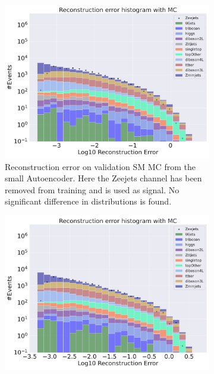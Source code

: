 \begin{figure}[H]
    \centering
    \begin{subfigure}{.45\textwidth}
        \includegraphics[width=\textwidth]{Figures/AE_testing/small/b_data_recon_big_rm3_feats_sig_Zeejets.pdf}
        \caption{Reconstruction error on validation SM MC from the small Autoencoder. Here the Zeejets channel has been removed from training and 
        is used as signal. No significant difference in distributions is found.}
        \label{fig:ae_small_Zeejets}
    \end{subfigure}
    \hfill 
    \begin{subfigure}{.45\textwidth}
        \includegraphics[width=\textwidth]{Figures/AE_testing/big/b_data_recon_big_rm3_feats_sig_Zeejets.pdf}

\end{subfigure}
\end{figure}
